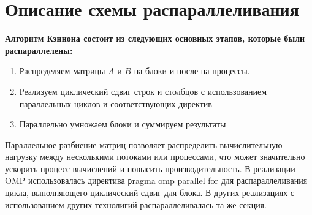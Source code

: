 \documentclass{report}
\begin{document}
\section* {Описание схемы распараллеливания}
\par \textbf{Алгоритм Кэннона состоит из следующих основных этапов, которые были распараллелены:}
\begin{enumerate}
\item Распределяем матрицы $A$ и $B$ на блоки и после на процессы. 
\item Реализуем циклический сдвиг строк и столбцов с использованием параллельных циклов и соответствующих директив
\item Параллельно умножаем блоки и суммируем результаты
\end{enumerate}

\par Параллельное разбиение матриц позволяет распределить вычислительную нагрузку между несколькими потоками или процессами, что может значительно ускорить процесс вычислений и повысить производительность. В реализации OMP использовалась директива \texttt pragma omp parallel for для распараллеливания цикла, выполняющего циклический сдвиг для блока. В других реализациях с использованием других технолигий распараллеливалась та же секция.

\newpage

\end{document}

